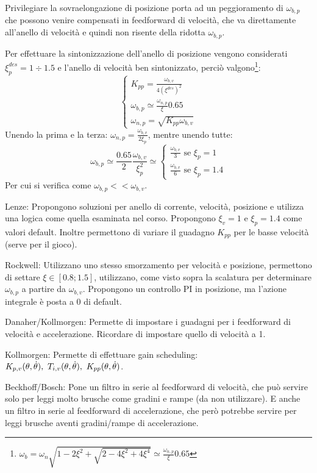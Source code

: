 Privilegiare la sovraelongazione di posizione porta ad un peggioramento di \(\omega_{b,p}\) che possono venire compensati in feedforward di velocità, che va direttamente all'anello di velocità e quindi non risente della ridotta \(\omega_{b,p}\).

Per effettuare la sintonizzazione dell'anello di posizione vengono considerati \(\xi^{des}_p = 1\div 1.5\) e l'anello di velocità ben sintonizzato, perciò valgono\footnote{\(\omega_b = \omega_n \sqrt{1-2\xi^2+\sqrt{2-4\xi^2+4\xi^4}}\simeq \frac{\omega_{n,p}}{\xi} 0.65\)}:
\[\begin{cases}
    K_{pp} = \frac{\omega_{b,v}}{4(\xi^{des})^2} \\
    \omega_{b,p} \simeq \frac{\omega_{n,p}}{\xi} 0.65 \\
    \omega_{n,p} = \sqrt{K_{pp} \omega_{b,v}}
\end{cases}
\]
Unendo la prima e la terza: \(\omega_{n,p} = \frac{\omega_{b,v}}{2\xi_p}\), mentre unendo tutte: \[\omega_{b,p}\simeq \frac{0.65}{2}\frac{\omega_{b,v}}{\xi^2_p} \simeq 
\begin{cases}
    \frac{\omega_{b,v}}{3} \text{ \ se \ } \xi_p = 1 \\
    \frac{\omega_{b,v}}{6} \text{ \ se \ } \xi_p = 1.4
\end{cases}
\]
Per cui si verifica come \(\omega_{b,p} << \omega_{b,v}\). \label{ordine_anello_pos_vel}

Lenze: Propongono soluzioni per anello di corrente, velocità, posizione e utilizza una logica come quella esaminata nel corso. Propongono \(\xi_v=1\) e \(\xi_p=1.4\) come valori default. Inoltre permettono di variare il guadagno \(K_{pp}\) per le basse velocità (serve per il gioco).

Rockwell: Utilizzano uno stesso smorzamento per velocità e posizione, permettono di settare \(\xi\in [0.8; 1.5]\), utilizzano, come visto sopra la scalatura per determinare \(\omega_{b,p}\) a partire da \(\omega_{b,v}\). Propongono un controllo PI in posizione, ma l'azione integrale è posta a 0 di default.

Danaher/Kollmorgen: Permette di impostare i guadagni per i feedforward di velocità e accelerazione. Ricordare di impostare quello di velocità a 1.

Kollmorgen: Permette di effettuare gain scheduling: \(K_{p,v}(\theta,\dot{\theta}), \ T_{i,v}(\theta,\dot{\theta}), \ K_{pp}(\theta,\dot{\theta})\).

Beckhoff/Bosch: Pone un filtro in serie al feedforward di velocità, che può servire solo per leggi molto brusche come gradini e rampe (da non utilizzare). E anche un filtro in serie al feedforward di accelerazione, che però potrebbe servire per leggi brusche aventi gradini/rampe di accelerazione.

